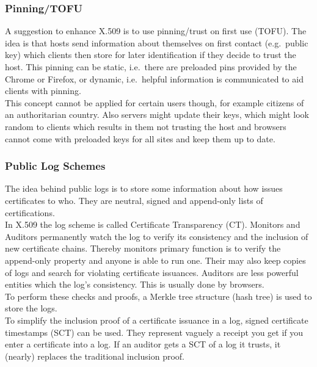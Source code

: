 \subsubsection{Pinning/TOFU}
A suggestion to enhance X.509 is to use pinning/trust on first use (TOFU).
The idea is that hosts send information about themselves on first contact (e.g.\ public key) which clients then store for later identification if they decide to trust the host.
This pinning can be static, i.e.\ there are preloaded pins provided by the Chrome or Firefox, or dynamic, i.e.\ helpful information is communicated to aid clients with pinning.\\
This concept cannot be applied for certain users though, for example citizens of an authoritarian country.
Also servers might update their keys, which might look random to clients which results in them not trusting the host and browsers cannot come with preloaded keys for all sites and keep them up to date.

\subsubsection{Public Log Schemes}
The idea behind public logs is to store some information about how issues certificates to who.
They are neutral, signed and append-only lists of certifications.\\

In X.509 the log scheme is called Certificate Transparency (CT).
Monitors and Auditors permanently watch the log to verify its consistency and the inclusion of new certificate chains.
Thereby monitors primary function is to verify the append-only property and anyone is able to run one.
Their may also keep copies of logs and search for violating certificate issuances.
Auditors are less powerful entities which the log's consistency.
This is usually done by browsers.\\
To perform these checks and proofs, a Merkle tree structure (hash tree) is used to store the logs.\\
To simplify the inclusion proof of a certificate issuance in a log, signed certificate timestamps (SCT) can be used.
They represent vaguely a receipt you get if you enter a certificate into a log.
If an auditor gets a SCT of a log it trusts, it (nearly) replaces the traditional inclusion proof.
